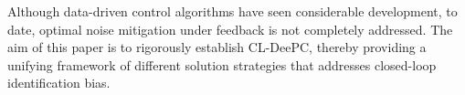 Although data-driven control algorithms have seen considerable development, to date, optimal noise mitigation under feedback is not completely addressed.
The aim of this paper is to rigorously establish \ac{CL-DeePC}, thereby providing a unifying framework of different solution strategies that addresses closed-loop identification bias. %
%
%

